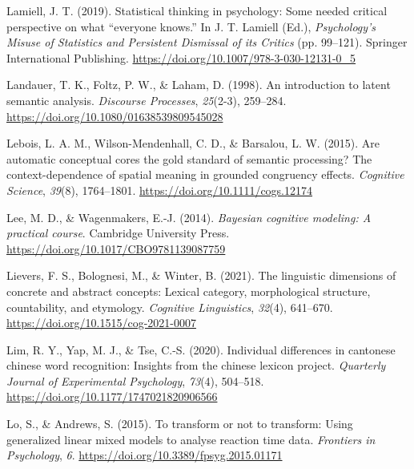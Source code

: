 \documentclass[
  12pt,
  man,floatsintext]{apa7}
\newlength{\cslhangindent}
\newlength{\cslentryspacingunit} %
\newenvironment{CSLReferences}[2] %
 {%
  \setlength{\parindent}{0pt}
  \ifodd #1
  \let\oldpar\par
  \def\par{\hangindent=\cslhangindent\oldpar}
  \fi
  \setlength{\parskip}{#2\cslentryspacingunit}
 }%
 {}
\begin{document}
\begin{CSLReferences}{1}{0}
\leavevmode{}%
Lamiell, J. T. (2019). Statistical thinking in psychology: Some needed critical perspective on what {``everyone knows.''} In J. T. Lamiell (Ed.), \emph{Psychology's {Misuse} of {Statistics} and {Persistent Dismissal} of its {Critics}} (pp. 99--121). {Springer International Publishing}. \url{https://doi.org/10.1007/978-3-030-12131-0_5}

\leavevmode{}%
Landauer, T. K., Foltz, P. W., \& Laham, D. (1998). An introduction to latent semantic analysis. \emph{Discourse Processes}, \emph{25}(2-3), 259--284. \url{https://doi.org/10.1080/01638539809545028}

\leavevmode{}%
Lebois, L. A. M., Wilson-Mendenhall, C. D., \& Barsalou, L. W. (2015). Are automatic conceptual cores the gold standard of semantic processing? {The} context-dependence of spatial meaning in grounded congruency effects. \emph{Cognitive Science}, \emph{39}(8), 1764--1801. \url{https://doi.org/10.1111/cogs.12174}

\leavevmode{}%
Lee, M. D., \& Wagenmakers, E.-J. (2014). \emph{Bayesian cognitive modeling: {A} practical course}. {Cambridge University Press}. \url{https://doi.org/10.1017/CBO9781139087759}

\leavevmode{}%
Lievers, F. S., Bolognesi, M., \& Winter, B. (2021). The linguistic dimensions of concrete and abstract concepts: Lexical category, morphological structure, countability, and etymology. \emph{Cognitive Linguistics}, \emph{32}(4), 641--670. \url{https://doi.org/10.1515/cog-2021-0007}

\leavevmode{}%
Lim, R. Y., Yap, M. J., \& Tse, C.-S. (2020). Individual differences in cantonese chinese word recognition: {Insights} from the chinese lexicon project. \emph{Quarterly Journal of Experimental Psychology}, \emph{73}(4), 504--518. \url{https://doi.org/10.1177/1747021820906566}

\leavevmode{}%
Lo, S., \& Andrews, S. (2015). To transform or not to transform: Using generalized linear mixed models to analyse reaction time data. \emph{Frontiers in Psychology}, \emph{6}. \url{https://doi.org/10.3389/fpsyg.2015.01171}


\end{CSLReferences}
\end{document}
